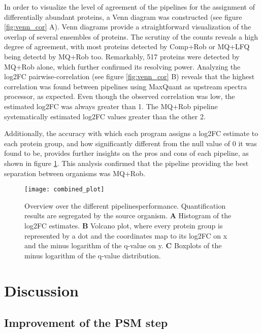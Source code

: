 In order to visualize the level of agreement of the pipelines for the assignment of differentially abundant proteins, a Venn diagram was constructed (see figure \ref{fig:venn_cor} A). Venn diagrams provide a straightforward visualization of the overlap of several ensembles of proteins. The scrutiny of the counts reveals a high degree of agreement, with most proteins detected by Comp+Rob or MQ+LFQ being detectd by MQ+Rob too. Remarkably, 517 proteins were detected by MQ+Rob alone, which further confirmed its resolving power. Analyzing the log2FC pairwise-correlation (see figure \ref{fig:venn_cor} B) reveals that the highest correlation was found between pipelines using MaxQuant as upstream spectra processor, as expected. Even though the observed correlation was low, the estimated log2FC was always greater than 1. The MQ+Rob pipeline systematically estimated \ac{log2FC} values greater than the other 2.


Additionally, the accuracy with which each program assigns a \ac{log2FC} estimate to each protein group, and how significantly different from the null value of 0 it was found to be, provides further insights on the pros and cons of each pipeline, as shown in figure \ref{fig:combined_plot}. This analysis confirmed that the pipeline providing the best separation between organisms was MQ+Rob.




\begin{figure}[H]
\centering
\texttt{[image: combined\_plot]}
\caption{Overview over the different pipelines\textquotesingle performance. Quantification results are segregated by the source organism. \textbf{A} Histogram of the \ac{log2FC} estimates. \textbf{B} Volcano plot, where every protein group is represented by a dot and the coordinates map to its \ac{log2FC} on x and the minus logarithm of the q-value on y. \textbf{C} Boxplots of the minus logarithm of the q-value distribution.}
\label{fig:combined_plot}
\end{figure}



\section{Discussion}

\subsection{Improvement of the PSM step}

